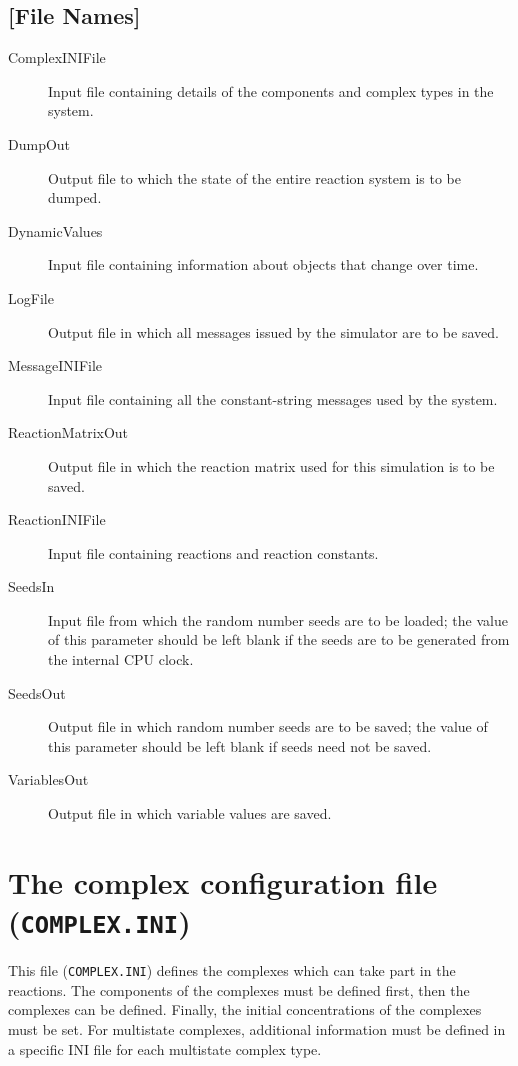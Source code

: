 \subsection{[File Names]}
\begin{description}
\item[ComplexINIFile] Input file containing details of the components
  and complex types in the system.
       
\item[DumpOut] Output file to which the state of the entire reaction
  system is to be dumped.
  
\item[DynamicValues] Input file containing information about objects
  that change over time.
  
\item[LogFile] Output file in which all messages issued by the
  simulator are to be saved.
  
\item[MessageINIFile] Input file containing all the constant-string
  messages used by the system.
  
\item[ReactionMatrixOut] Output file in which the reaction matrix used
  for this simulation is to be saved.
  
\item[ReactionINIFile] Input file containing reactions and reaction
  constants.
  
\item[SeedsIn] Input file from which the random number seeds are to be
  loaded; the value of this parameter should be left blank if the seeds
  are to be generated from the internal CPU clock.
  
\item[SeedsOut] Output file in which random number seeds are to be
  saved; the value of this parameter should be left blank if seeds
  need not be saved.

\item[VariablesOut] Output file in which variable values are saved.
\end{description}

\section{The complex configuration file (\texttt{COMPLEX.INI})}

This file (\texttt{COMPLEX.INI}) defines the complexes which can take part in
the reactions.  The components of the complexes must be defined first,
then the complexes can be defined. Finally, the initial concentrations
of the complexes must be set. For multistate complexes, additional
information must be defined in a specific INI file for each multistate
complex type.

